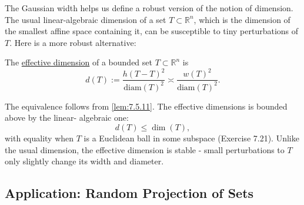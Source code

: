 The Gaussian width helps us define a robust version of the notion of dimension. The usual linear-algebraic 
dimension of a set $T \subset \mathbb{R}^n$, which is the dimension of the smallest affine space containing it, 
can be susceptible to tiny perturbations of $T$. Here is a more robust alternative: 

\begin{definition}[]
\label{def:7.5.12}
The \underline{effective dimension} of a bounded set $T \subset \mathbb{R}^n$ is 
\[ d(T) := \frac{h(T - T)^2}{\mathrm{diam}(T)^2} \asymp \frac{w(T)^2}{\mathrm{diam}(T)^2}. \]
\end{definition}

The equivalence follows from \cref{lem:7.5.11}. The effective dimensions is bounded above by the linear-
algebraic one: 
\[ d(T) \leq \dim{(T)}, \]
with equality when $T$ is a Euclidean ball in some subspace (Exercise 7.21). Unlike the usual dimension, the 
effective dimension is stable - small perturbations to $T$ only slightly change its width and diameter.



\subsection{Application: Random Projection of Sets}
